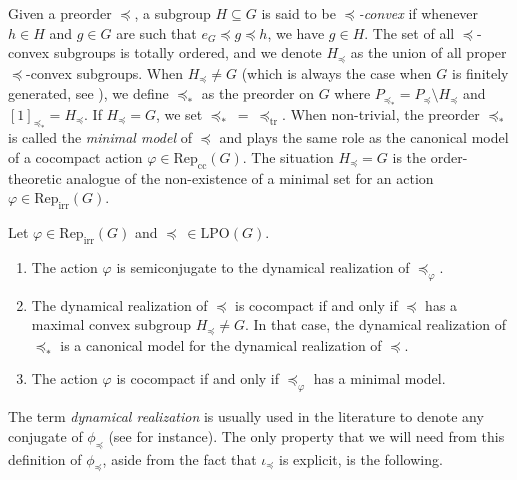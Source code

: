 \documentclass[reqno]{amsart}
\begin{document}
Given a preorder $\preceq$, a subgroup $H \subseteq G$ is said to be \emph{$\preceq$-convex} if whenever $h \in H$ and $g \in G$ are such that $e_G \preceq g \preceq h$, we have $g \in H$. The set of all $\preceq$-convex subgroups is totally ordered, and we denote $H_\preceq$ as the union of all proper $\preceq$-convex subgroups. When $H_\preceq \neq G$ (which is always the case when $G$ is finitely generated, see \cite[Example 2.1.2]{DeroinNavasRivas2016}), we define $\preceq_\ast$ as the preorder on $G$ where $P_{\preceq_\ast} = P_{\preceq} \setminus H_\preceq$ and $[1]_{\preceq_\ast} = H_\preceq$. If $H_\preceq = G$, we set $\preceq_\ast\  =\  \preceq_\mathrm{tr}$. When non-trivial, the preorder $\preceq_\ast$ is called the \emph{minimal model} of $\preceq$ and plays the same role as the canonical model of a cocompact action $\varphi \in \mathrm{Rep}_\mathrm{cc}(G)$. The situation $H_\preceq = G$ is the order-theoretic analogue of the non-existence of a minimal set for an action $\varphi \in \mathrm{Rep}_\mathrm{irr}(G)$.


\begin{prop} \label{prop:preordenesBMRT1}
Let $\varphi \in \mathrm{Rep}_\mathrm{irr}(G)$ and $\preceq \ \in \mathrm{LPO}(G)$.

\begin{enumerate}
	\item\label{it:appi} The action $\varphi$ is semiconjugate to the dynamical realization of $\preceq_\varphi$.

	\item\label{it:appii} The dynamical realization of $\preceq$ is cocompact if and only if $\preceq$ has a maximal convex subgroup $H_\preceq \neq G$. In that case, the dynamical realization of $\preceq_\ast$ is a canonical model for the dynamical realization of $\preceq$.

	\item\label{it:appiii} The action $\varphi$ is cocompact if and only if $\preceq_\varphi$ has a minimal model.
\end{enumerate}
\end{prop}

The term \emph{dynamical realization} is usually used in the literature to denote any conjugate of $\phi_\preceq$ (see \cite[Section 1.1.3]{DeroinNavasRivas2016} for instance). The only property that we will need from this definition of $\phi_\preceq$, aside from the fact that $\iota_\preceq$ is explicit, is the following.
\end{document}
